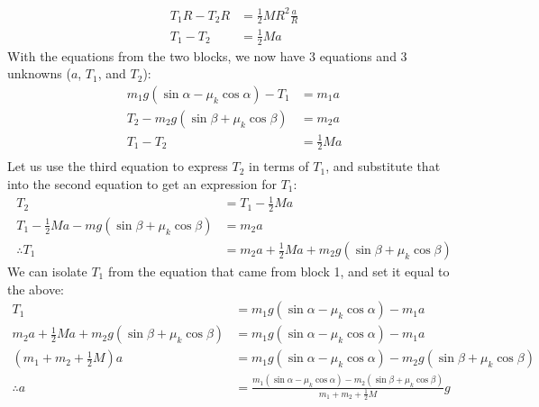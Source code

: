 \begin{solution}
\begin{align*}
T_1R-T_2R&=\frac{1}{2}MR^2 \frac{a}{R}\\
T_1-T_2&=\frac{1}{2}Ma
\end{align*}
With the equations from the two blocks, we now have 3 equations and 3 unknowns ($a$, $T_1$, and $T_2$):
\begin{align*}
 m_1g(\sin\alpha-\mu_k\cos\alpha)-T_1&=m_1a\\
 T_2-m_2g(\sin\beta+\mu_k\cos\beta)&=m_2a\\
 T_1-T_2&=\frac{1}{2}Ma\\
\end{align*}
Let us use the third equation to express $T_2$ in terms of $T_1$, and substitute that into the second equation to get an expression for $T_1$:
\begin{align*}
T_2&=T_1-\frac{1}{2}Ma\\
T_1-\frac{1}{2}Ma-mg(\sin\beta+\mu_k\cos\beta)&=m_2a\\
\therefore T_1&=m_2a+\frac{1}{2}Ma+m_2g(\sin\beta+\mu_k\cos\beta)
\end{align*}
We can isolate $T_1$ from the equation that came from block 1, and set it equal to the above:
\begin{align*}
T_1&= m_1g(\sin\alpha-\mu_k\cos\alpha)-m_1a\\
m_2a+\frac{1}{2}Ma+m_2g(\sin\beta+\mu_k\cos\beta) &= m_1g(\sin\alpha-\mu_k\cos\alpha)-m_1a\\
(m_1+m_2+\frac{1}{2}M)a &=m_1g(\sin\alpha-\mu_k\cos\alpha)-m_2g(\sin\beta+\mu_k\cos\beta)\\
\therefore a &= \frac{m_1(\sin\alpha-\mu_k\cos\alpha)-m_2(\sin\beta+\mu_k\cos\beta)}{m_1+m_2+\frac{1}{2}M}g
\end{align*}
 
\end{solution}



